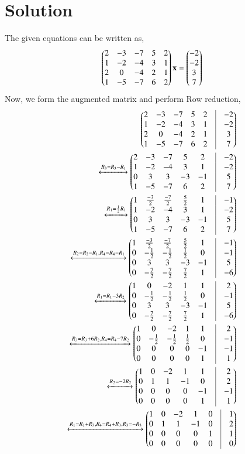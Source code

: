 \documentclass[journal,12pt,twocolumn]{IEEEtran}
\begin{document}
\section{Solution}
   The given equations can be written as,
   \begin{align}
  \begin{pmatrix}2&-3&-7&5&2\\1&-2&-4&3&1\\2&0&-4&2&1\\1&-5&-7&6&2\end{pmatrix}\mathbf{x}=\begin{pmatrix}-2\\-2\\3\\7\end{pmatrix}
   \end{align}
   Now, we form the augmented matrix and perform Row reduction,
   \begin{align}
      \myvec{2&-3&-7&5&2&\vrule&-2\\1&-2&-4&3&1&\vrule&-2\\2&0&-4&2&1&\vrule&3\\1&-5&-7&6&2&\vrule&7}\\
        \xleftrightarrow{R_3=R_3-R_1}\myvec{2&-3&-7&5&2&\vrule&-2\\1&-2&-4&3&1&\vrule&-2\\0&3&3&-3&-1&\vrule&5\\1&-5&-7&6&2&\vrule&7}\\
     \xleftrightarrow{R_1=\frac{1}{2}R_1}\myvec{1&\frac{-3}{2}&\frac{-7}{2}&\frac{5}{2}&1&\vrule&-1\\1&-2&-4&3&1&\vrule&-2\\0&3&3&-3&-1&\vrule&5\\1&-5&-7&6&2&\vrule&7}\\
      \xleftrightarrow{R_2=R_2-R_1,R_4=R_4-R_1}\myvec{1&\frac{-3}{2}&\frac{-7}{2}&\frac{5}{2}&1&\vrule&-1\\0&-\frac{1}{2}&-\frac{1}{2}&\frac{1}{2}&0&\vrule&-1\\0&3&3&-3&-1&\vrule&5\\0&-\frac{7}{2}&-\frac{7}{2}&\frac{7}{2}&1&\vrule&-6}\\
      \xleftrightarrow{R_1=R_1-3R_2}\myvec{1&0&-2&1&1&\vrule&2\\0&-\frac{1}{2}&-\frac{1}{2}&\frac{1}{2}&0&\vrule&-1\\0&3&3&-3&-1&\vrule&5\\0&-\frac{7}{2}&-\frac{7}{2}&\frac{7}{2}&1&\vrule&-6}\\
      \xleftrightarrow{R_3=R_3+6R_2, R_4=R_4-7R_2}\myvec{1&0&-2&1&1&\vrule&2\\0&-\frac{1}{2}&-\frac{1}{2}&\frac{1}{2}&0&\vrule&-1\\0&0&0&0&-1&\vrule&-1\\0&0&0&0&1&\vrule&1}\\
      \xleftrightarrow{R_2=-2R_2}\myvec{1&0&-2&1&1&\vrule&2\\0&1&1&-1&0&\vrule&2\\0&0&0&0&-1&\vrule&-1\\0&0&0&0&1&\vrule&1}\\
      \xleftrightarrow{R_1=R_1+R_3,R_4=R_4+R_3,R_3=-R_3}\myvec{1&0&-2&1&0&\vrule&1\\0&1&1&-1&0&\vrule&2\\0&0&0&0&1&\vrule&1\\0&0&0&0&0&\vrule&0}
\end{align}
\end{document}
